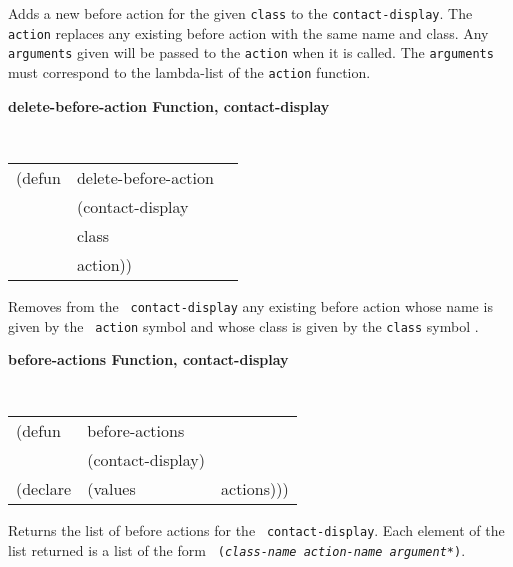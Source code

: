 \begin{flushright} \parbox[t]{6.125in} { Adds a new before action for the given
{\tt class} to the {\tt contact-display}.  The {\tt action} replaces any
existing before action with the same name and class.  Any {\tt arguments} given
will be passed to the {\tt action} when it is called.  The {\tt arguments} must
correspond to the lambda-list of the {\tt action} function.

}\end{flushright}

{\samepage
{\large {\bf delete-before-action \hfill Function, contact-display}} 
\begin{flushright} \parbox[t]{6.125in}{
\tt
\begin{tabular}{lll}
\raggedright
(defun & delete-before-action & \\ 
& (contact-display\\
& class\\
& action))
\end{tabular}
\rm

}\end{flushright}}


\begin{flushright} \parbox[t]{6.125in}{ Removes from the {\tt
contact-display} any existing before action whose name is given by the {\tt
action} symbol and whose class is given by the {\tt class} symbol .

}\end{flushright}


{\large {\bf before-actions \hfill Function, contact-display}} 
\begin{flushright} \parbox[t]{6.125in}{
\tt
\begin{tabular}{lll}
\raggedright
(defun & before-actions & \\ 
& (contact-display)\\
(declare &(values  & actions)))
\end{tabular}
\rm

}\end{flushright}


\begin{flushright} \parbox[t]{6.125in}{
Returns the list of before actions for the {\tt
contact-display}. Each element of the list returned is a list of the form {\tt
({\em class-name action-name argument*})}.

}\end{flushright}



